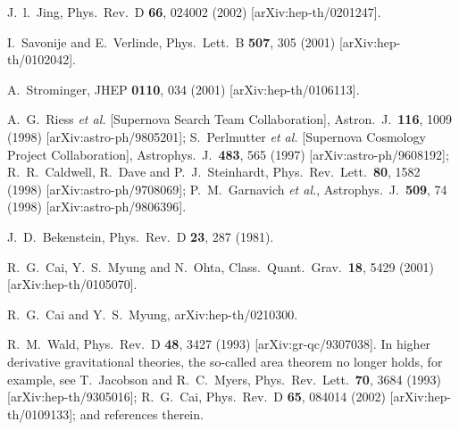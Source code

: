 \documentclass[a4paper,12pt]{article}
\begin{document}
\begin{thebibliography}{99}
J.~l.~Jing,
Phys.\ Rev.\ D {\bf 66}, 024002 (2002) [arXiv:hep-th/0201247].

I.~Savonije and E.~Verlinde,
Phys.\ Lett.\ B {\bf 507}, 305 (2001) [arXiv:hep-th/0102042].

A.~Strominger,
JHEP {\bf 0110}, 034 (2001) [arXiv:hep-th/0106113].

A.~G.~Riess {\it et al.}  [Supernova Search Team Collaboration],
Astron.\ J.\  {\bf 116}, 1009 (1998) [arXiv:astro-ph/9805201];
S.~Perlmutter {\it et al.}  [Supernova Cosmology Project
Collaboration],
Astrophys.\ J.\  {\bf 483}, 565 (1997) [arXiv:astro-ph/9608192];
R.~R.~Caldwell, R.~Dave and P.~J.~Steinhardt,
Phys.\ Rev.\ Lett.\  {\bf 80}, 1582 (1998)
[arXiv:astro-ph/9708069];
P.~M.~Garnavich {\it et al.},
Astrophys.\ J.\  {\bf 509}, 74 (1998) [arXiv:astro-ph/9806396].

J.~D.~Bekenstein,
Phys.\ Rev.\ D {\bf 23}, 287 (1981).

R.~G.~Cai, Y.~S.~Myung and N.~Ohta,
Class.\ Quant.\ Grav.\  {\bf 18}, 5429 (2001)
[arXiv:hep-th/0105070].

 R.~G.~Cai and Y.~S.~Myung,
arXiv:hep-th/0210300.

R.~M.~Wald,
Phys.\ Rev.\ D {\bf 48}, 3427 (1993)
[arXiv:gr-qc/9307038].
In higher derivative gravitational theories, the so-called area theorem 
no longer holds, for example, see
T.~Jacobson and R.~C.~Myers,
Phys.\ Rev.\ Lett.\  {\bf 70}, 3684 (1993) [arXiv:hep-th/9305016];
R.~G.~Cai,
Phys.\ Rev.\ D {\bf 65}, 084014 (2002)
[arXiv:hep-th/0109133];
and references therein. 


\end{thebibliography}
\end{document}
